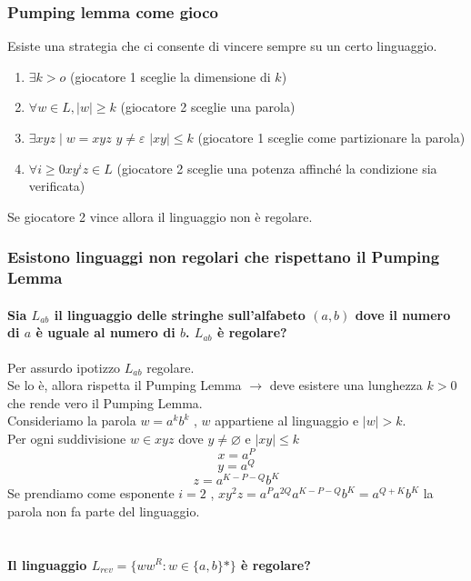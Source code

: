 \subsubsection{Pumping lemma come gioco} 
Esiste una strategia che ci consente di vincere sempre su un certo linguaggio. 
\begin{enumerate}
	\item $\exists k>o$  (giocatore 1 sceglie la dimensione di $k$)
	\item $\forall w\in L, |w|\geq k$ (giocatore 2 sceglie una parola)
	\item $\exists xyz\mid w= xyz$
		$y\neq \varepsilon$ 
		$|xy| \leq k$ (giocatore 1 sceglie come partizionare la parola)
	\item	$\forall i\geq 0 xy^iz\in L$ (giocatore 2 sceglie una potenza affinché la condizione sia verificata)
\end{enumerate}
Se giocatore 2 vince allora il linguaggio non è regolare. 

\subsubsection{Esistono linguaggi non regolari che rispettano il Pumping Lemma}

\paragraph{Sia $L_{ab}$ il linguaggio delle stringhe sull'alfabeto $(a,b)$ dove il numero di $a$ è uguale al numero di $b$. $L_{ab}$ è regolare?}\nin
Per assurdo ipotizzo $L_{ab}$ regolare. \\
Se lo è, allora rispetta il Pumping Lemma $\rightarrow$ deve esistere una lunghezza $k>0$ che rende vero il Pumping Lemma.\\
Consideriamo la parola $w=a^kb^k$ , $w$ appartiene al linguaggio e $|w|>k$.\\
Per ogni suddivisione $w\in xyz$ dove $y\neq \varnothing$ e $|xy|\leq k$ \\
$$x = a^P$$
$$y = a^Q$$
$$z = a^{K-P-Q}b^K$$
Se prendiamo come esponente $i=2$ , $xy^2z=a^Pa^{2Q}a^{K-P-Q}b^K= a^{Q+K}b^K$ la parola non fa parte del linguaggio.\\
\\

\paragraph{Il linguaggio $L_{rev} = \{ww^R:w \in\{a,b\}*\}$ è regolare?}\nin\\

